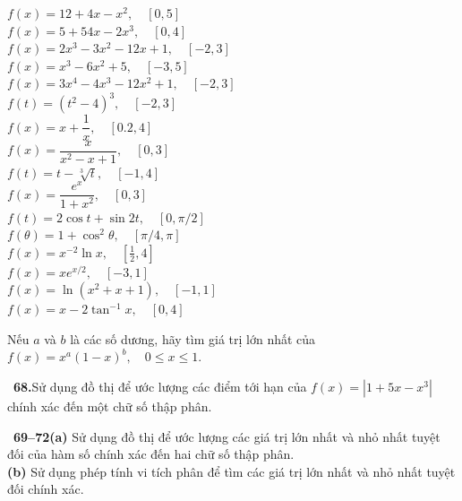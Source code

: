 \begin{minipage}[t]{0.485\textwidth}
\vspace{4pt}
$f(x) = 12 + 4x - x^2, \quad [0, 5]$\\[3pt]
$f(x) = 5 + 54x - 2x^3, \quad [0, 4]$\\[3pt]
$f(x) = 2x^3 - 3x^2 - 12x + 1, \quad [-2, 3]$\\[3pt]
$f(x) = x^3 - 6x^2 + 5, \quad [-3, 5]$\\[3pt]
$f(x) = 3x^4 - 4x^3 - 12x^2 + 1, \quad [-2, 3]$\\[3pt]
$f(t) = (t^2 - 4)^3, \quad [-2, 3]$\\[3pt]
$f(x) = x + \dfrac{1}{x}, \quad [0.2, 4]$\\[4pt]
$f(x) = \dfrac{x}{x^2 - x + 1}, \quad [0, 3]$\\[4pt]
$f(t) = t - \sqrt[3]{t}, \quad [-1, 4]$\\[3pt]
$f(x) = \dfrac{e^x}{1 + x^2}, \quad [0, 3]$\\[4pt]
$f(t) = 2\cos t + \sin 2t, \quad [0, \pi/2]$\\[3pt]
$f(\theta) = 1 + \cos^2\theta, \quad [\pi/4, \pi]$\\[3pt]
$f(x) = x^{-2}\ln x, \quad \left[\frac{1}{2}, 4\right]$\\[3pt]
$f(x) = xe^{x/2}, \quad [-3, 1]$\\[3pt]
$f(x) = \ln(x^2 + x + 1), \quad [-1, 1]$\\[3pt]
$f(x) = x - 2\tan^{-1}x, \quad [0, 4]$

\vspace{8pt}
Nếu $a$ và $b$ là các số dương, hãy tìm giá trị lớn nhất của $f(x) = x^a(1 - x)^b, \quad 0 \le x \le 1$.

\vspace{4pt}
\graphicon\ \textbf{68.}\quad Sử dụng đồ thị để ước lượng các điểm tới hạn của $f(x) = |1 + 5x - x^3|$ chính xác đến một chữ số thập phân.

\vspace{4pt}
\graphicon\ {\color{stewartcyan}\textbf{69--72}}\quad \textbf{(a)} Sử dụng đồ thị để ước lượng các giá trị lớn nhất và nhỏ nhất tuyệt đối của hàm số chính xác đến hai chữ số thập phân.\\[2pt]
\hspace*{1.8em}\textbf{(b)} Sử dụng phép tính vi tích phân để tìm các giá trị lớn nhất và nhỏ nhất tuyệt đối chính xác.


\end{minipage}
